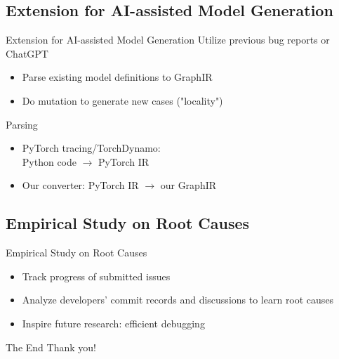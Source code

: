 \documentclass{beamer}
\begin{document}
\subsection{Extension for AI-assisted Model Generation}
\begin{frame}{Extension for AI-assisted Model Generation}
    Utilize previous bug reports or ChatGPT
    \begin{itemize}
        \item Parse existing model definitions to GraphIR
        \item Do mutation to generate new cases ("locality")
    \end{itemize}
    Parsing
    \begin{itemize}
        \item PyTorch tracing/TorchDynamo:\\Python code $\rightarrow$ PyTorch IR
        \item Our converter: PyTorch IR $\rightarrow$ our GraphIR
    \end{itemize}
\end{frame}

\subsection{Empirical Study on Root Causes}
\begin{frame}{Empirical Study on Root Causes}
    \begin{itemize}
        \item Track progress of submitted issues
        \item Analyze developers' commit records and discussions to learn root causes
        \item Inspire future research: efficient debugging
    \end{itemize}
\end{frame}

\begin{frame}{The End}
    Thank you!    
\end{frame}

\end{document}
